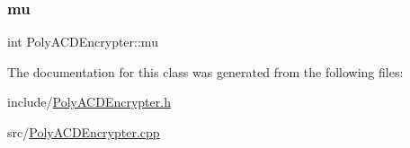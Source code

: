 \subsubsection{\texorpdfstring{mu}{mu}}
{\footnotesize\ttfamily int Poly\+A\+C\+D\+Encrypter\+::mu\hspace{0.3cm}{\ttfamily [private]}}



The documentation for this class was generated from the following files\+:\begin{DoxyCompactItemize}
\item 
include/\hyperlink{PolyACDEncrypter_8h}{Poly\+A\+C\+D\+Encrypter.\+h}\item 
src/\hyperlink{PolyACDEncrypter_8cpp}{Poly\+A\+C\+D\+Encrypter.\+cpp}\end{DoxyCompactItemize}
